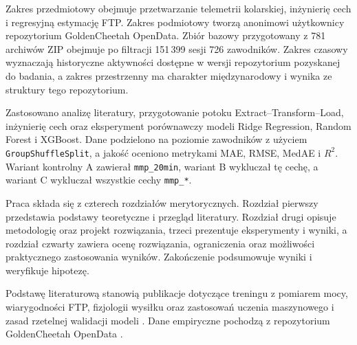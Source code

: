 Zakres przedmiotowy obejmuje przetwarzanie telemetrii kolarskiej, inżynierię cech i regresyjną estymację FTP. Zakres podmiotowy tworzą anonimowi użytkownicy repozytorium GoldenCheetah OpenData. Zbiór bazowy przygotowany z 781 archiwów ZIP obejmuje po filtracji 151\,399 sesji 726 zawodników. Zakres czasowy wyznaczają historyczne aktywności dostępne w wersji repozytorium pozyskanej do badania, a zakres przestrzenny ma charakter międzynarodowy i wynika ze struktury tego repozytorium.

Zastosowano analizę literatury, przygotowanie potoku Extract--Transform--Load, inżynierię cech oraz eksperyment porównawczy modeli Ridge Regression, Random Forest i XGBoost. Dane podzielono na poziomie zawodników z użyciem \texttt{GroupShuffleSplit}, a jakość oceniono metrykami MAE, RMSE, MedAE i $R^2$. Wariant kontrolny A zawierał \texttt{mmp\_20min}, wariant B wykluczał tę cechę, a wariant C wykluczał wszystkie cechy \texttt{mmp\_*}.

Praca składa się z czterech rozdziałów merytorycznych. Rozdział pierwszy przedstawia podstawy teoretyczne i przegląd literatury. Rozdział drugi opisuje metodologię oraz projekt rozwiązania, trzeci prezentuje eksperymenty i wyniki, a rozdział czwarty zawiera ocenę rozwiązania, ograniczenia oraz możliwości praktycznego zastosowania wyników. Zakończenie podsumowuje wyniki i weryfikuje hipotezę.

Podstawę literaturową stanowią publikacje dotyczące treningu z pomiarem mocy, wiarygodności FTP, fizjologii wysiłku oraz zastosowań uczenia maszynowego i zasad rzetelnej walidacji modeli \parencite{allen2019power,borszcz2018ftp,karsten2021cpftp,stockwell2023mlftp,denham2020predictftp,james2021isl,hastie2009esl}. Dane empiryczne pochodzą z repozytorium GoldenCheetah OpenData \parencite{osf_goldencheetah_opendata}.
